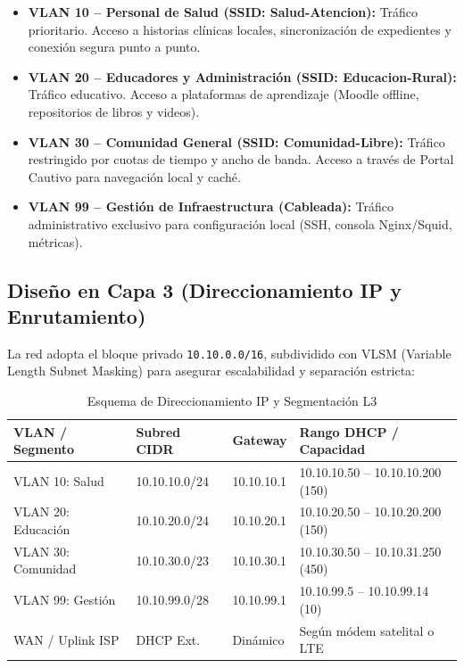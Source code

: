 \documentclass[conference]{IEEEtran}
\begin{document}
\begin{itemize}
    \item \textbf{VLAN 10 -- Personal de Salud (SSID: Salud-Atencion):} Tráfico prioritario. Acceso a historias clínicas locales, sincronización de expedientes y conexión segura punto a punto.
    \item \textbf{VLAN 20 -- Educadores y Administración (SSID: Educacion-Rural):} Tráfico educativo. Acceso a plataformas de aprendizaje (Moodle offline, repositorios de libros y videos).
    \item \textbf{VLAN 30 -- Comunidad General (SSID: Comunidad-Libre):} Tráfico restringido por cuotas de tiempo y ancho de banda. Acceso a través de Portal Cautivo para navegación local y caché.
    \item \textbf{VLAN 99 -- Gestión de Infraestructura (Cableada):} Tráfico administrativo exclusivo para configuración local (SSH, consola Nginx/Squid, métricas).
\end{itemize}

\subsection{Diseño en Capa 3 (Direccionamiento IP y Enrutamiento)}
La red adopta el bloque privado \texttt{10.10.0.0/16}, subdividido con VLSM (Variable Length Subnet Masking) para asegurar escalabilidad y separación estricta:

\begin{table}[htbp]
\caption{Esquema de Direccionamiento IP y Segmentación L3}
\begin{center}
\begin{tabularx}{\columnwidth}{l l l X}
\toprule
\textbf{VLAN / Segmento} & \textbf{Subred CIDR} & \textbf{Gateway} & \textbf{Rango DHCP / Capacidad} \\
\midrule
VLAN 10: Salud & 10.10.10.0/24 & 10.10.10.1 & 10.10.10.50 -- 10.10.10.200 (150) \\
VLAN 20: Educación & 10.10.20.0/24 & 10.10.20.1 & 10.10.20.50 -- 10.10.20.200 (150) \\
VLAN 30: Comunidad & 10.10.30.0/23 & 10.10.30.1 & 10.10.30.50 -- 10.10.31.250 (450) \\
VLAN 99: Gestión & 10.10.99.0/28 & 10.10.99.1 & 10.10.99.5 -- 10.10.99.14 (10) \\
WAN / Uplink ISP & DHCP Ext. & Dinámico & Según módem satelital o LTE \\
\bottomrule
\end{tabularx}
\end{center}
\label{tab:ip_addressing}
\end{table}
\end{document}
